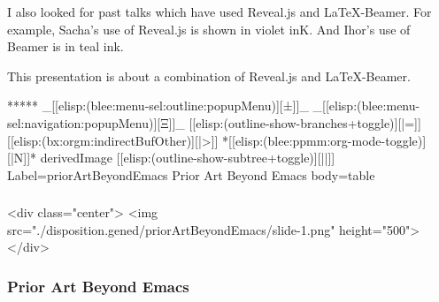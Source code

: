 \begin{whenOrg}
\begin{verblatex}
\begin{frame}[fragile,plain,label=priorArt]
{  I also looked for past talks which have used Reveal.js and LaTeX-Beamer.
  For example, Sacha's use of Reveal.js is shown in violet inK.
  And Ihor's use of Beamer is in teal ink.

  This presentation is about a combination of Reveal.js and LaTeX-Beamer.
}

\end{frame}
\end{verblatex}


\begin{whenOrg}
*****  _[[elisp:(blee:menu-sel:outline:popupMenu)][±]]_ _[[elisp:(blee:menu-sel:navigation:popupMenu)][Ξ]]_ [[elisp:(outline-show-branches+toggle)][|=]] [[elisp:(bx:orgm:indirectBufOther)][|>]] *[[elisp:(blee:ppmm:org-mode-toggle)][|N]]*  derivedImage [[elisp:(outline-show-subtree+toggle)][||]] Label=priorArtBeyondEmacs Prior Art Beyond Emacs body=table
\end{whenOrg}

\begin{htmlonly}

\begin{frame}[fragile,plain,label=priorArtBeyondEmacs]
    \frametitle{}
    \framesubtitle{}
    \begin{rawhtml}
<div class="center">
<img src="./disposition.gened/priorArtBeyondEmacs/slide-1.png" height="500">
</div>
    \end{rawhtml}
\end{frame}
\end{htmlonly}

\begin{verblatex}

\begin{frame}[fragile,plain,label=priorArtBeyondEmacs]
    \frametitle{Prior Art Beyond Emacs}
    \framesubtitle{}


\end{frame}
\end{verblatex}
\end{whenOrg}
